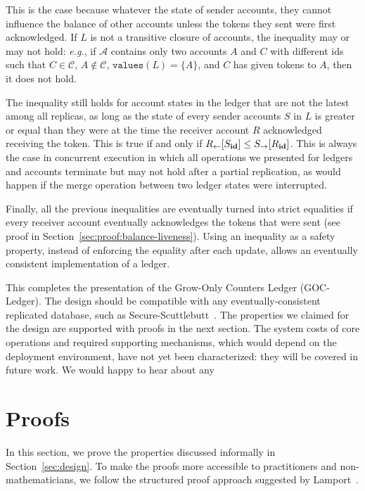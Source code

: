 \documentclass[9pt]{article}   	%
\begin{document}
This is the case because whatever the state of sender accounts, they cannot influence the balance of other accounts unless the tokens they sent were first acknowledged. If $L$ is not a transitive closure of accounts, the inequality may or may not hold: \textit{e.g.}, if $\mathcal{A}$ contains only two accounts $A$ and $C$ with different ids such that $C \in \mathcal{C}$, $A \notin \mathcal{C}$, $\texttt{values}(L) = \{ A \}$, and $C$ has given tokens to $A$, then it does not hold.

The inequality still holds for account states in the ledger that are not the latest among all replicas, as long as the state of every sender accounts $S$ in $L$ is greater or equal than they were at the time the receiver account $R$ acknowledged receiving the token. This is true if and only if $R_{\leftarrow}[S_{\scriptsize \textbf{id}}] \leq S_{\rightarrow}[R_{\scriptsize \textbf{id}}]$. This is always the case in concurrent execution in which all operations we presented for ledgers and accounts terminate but may not hold after a partial replication, as would happen if the merge operation between two ledger states were interrupted.

Finally, all the previous inequalities are eventually turned into strict equalities if every receiver account eventually acknowledges the tokens that were sent (see proof in Section~\ref{sec:proof:balance-liveness}). Using an inequality as a safety property, instead of enforcing the equality after each update, allows an eventually consistent implementation of a ledger.

This completes the presentation of the Grow-Only Counters Ledger (GOC-Ledger). The design should be compatible with any eventually-consistent replicated database, such as Secure-Scuttlebutt~\cite{kermarrec2020gossiping}. The properties we claimed for the design are supported with proofs in the next section. The system costs of core operations and required supporting mechanisms, which would depend on the deployment environment, have not yet been characterized: they will be covered in future work. We would happy to hear about any 

\section{Proofs}
\label{sec:proofs}

In this section, we prove the properties discussed informally in Section~\ref{sec:design}. To make the proofs more accessible to practitioners and non-mathematicians, we follow the structured proof approach suggested by Lamport~\cite{lamport2012write}.
\end{document}
